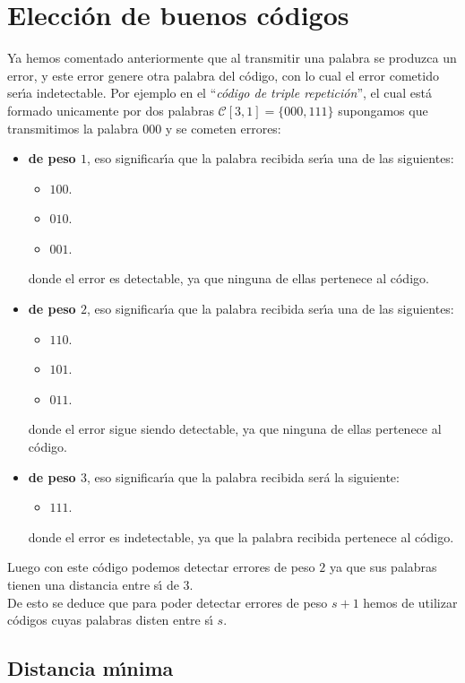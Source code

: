 %
%

\section{Elecci\'on de buenos c\'odigos}

Ya hemos comentado anteriormente que al transmitir una palabra se produzca un
error, y este error genere otra palabra del c\'odigo, con lo cual el error
cometido ser\'{\i}a indetectable. Por ejemplo en el ``\emph{c\'odigo de triple
repetici\'on}'', el cual est\'a formado unicamente por dos palabras
$\mathcal{C}[3,1]=\{000,111\}$ supongamos que transmitimos la palabra $000$ y se
cometen errores:
\begin{itemize}
\item \textbf{de peso $1$}, eso significar\'{\i}a que la palabra recibida
ser\'{\i}a una de las siguientes:
\begin{itemize}
\item $100$.
\item $010$.
\item $001$.
\end{itemize}
donde el error es detectable, ya que ninguna de ellas pertenece al c\'odigo.
\item \textbf{de peso $2$}, eso significar\'{\i}a que la palabra recibida
ser\'{\i}a una de las siguientes:
\begin{itemize}
\item $110$.
\item $101$.
\item $011$.
\end{itemize}
donde el error sigue siendo detectable, ya que ninguna de ellas pertenece al
c\'odigo. 
\item \textbf{de peso $3$}, eso significar\'{\i}a que la palabra recibida
ser\'a la siguiente:
\begin{itemize}
\item $111$.
\end{itemize}
donde el error es indetectable, ya que la palabra recibida pertenece al
c\'odigo.
\end{itemize}
Luego con este c\'odigo podemos detectar errores de peso $2$ ya que sus palabras
tienen una distancia entre s\'{\i} de $3$.\\

De esto se deduce que para poder detectar errores de peso $s+1$ hemos de 
utilizar c\'odigos cuyas palabras disten entre s\'{\i} $s$.

\subsection{Distancia m\'{\i}nima}

